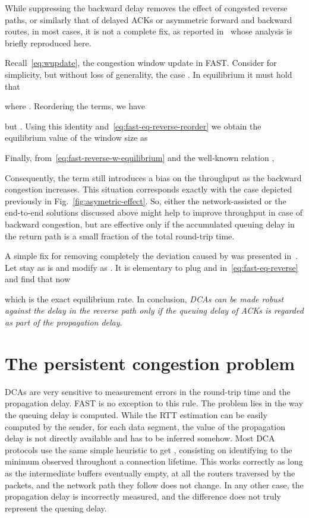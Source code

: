 \documentclass[english,times]{ettauth}
\begin{document}
While suppressing the backward delay removes the effect of congested reverse
paths, or similarly that of delayed ACKs or asymmetric forward and backward
routes, in most cases, it is not a complete fix, as reported
in~\cite{Herreria07} whose analysis is briefly reproduced here.

Recall~\eqref{eq:wupdate}, the congestion window update in FAST.  Consider for
simplicity, but without loss of generality, the case . In
equilibrium it must hold that

where . Reordering the terms, we have

but . Using this
identity and~\eqref{eq:fast-eq-reverse-reorder} we obtain the equilibrium
value of the window size as

Finally, from~\eqref{eq:fast-reverse-w-equilibrium} and the well-known
relation ,

Consequently, the term  still
introduces a bias on the throughput as the backward congestion increases. This
situation corresponds exactly with the case  depicted previously in
Fig.~\ref{fig:asymetric-effect}. So, either the network-assisted or the
end-to-end solutions discussed above might help to improve throughput in case
of backward congestion, but are effective only if the accumulated queuing
delay in the return path is a small fraction of the total round-trip time.

A simple fix for removing completely the deviation caused by
 was presented in~\cite{Herreria07}. Let  stay as is
and modify  as . It
is elementary to plug  and  in~\eqref{eq:fast-eq-reverse}
and find that now

which is the exact equilibrium rate. In conclusion, \emph{DCAs can be made
  robust against the delay in the reverse path only if the queuing delay of
  ACKs is regarded as part of the propagation delay}.

\section{The persistent congestion problem}
\label{sec:pers-cong-probl}

DCAs are very sensitive to measurement errors in the round-trip time and the
propagation delay. FAST is no exception to this rule. The problem lies in the
way the queuing delay is computed. While the RTT estimation  can be
easily computed by the sender, for each data segment, the value of the
propagation delay is not directly available and has to be inferred somehow.
Most DCA protocols use the same simple heuristic to get , consisting on
identifying  to the minimum  observed throughout a connection
lifetime. This works correctly as long as the intermediate buffers eventually
empty, at all the routers traversed by the packets, and the network path they
follow does not change. In any other case, the propagation delay is
incorrectly measured, and the difference  does not truly
represent the queuing delay.
\end{document}
